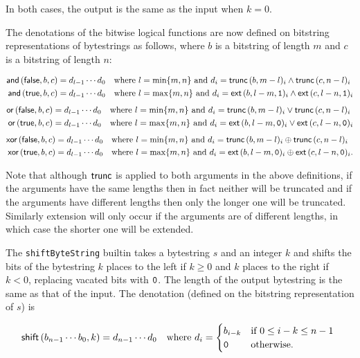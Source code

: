 \noindent In both cases, the output is the same as the input when $k=0$.
\smallskip

\noindent The denotations of the bitwise logical functions are now defined on bitstring
representations of bytestrings as follows, where $b$ is a bitstring of length $m$ and $c$
is a bitstring of length $n$:

\begin{align*}
\mathsf{and}\,(\mathsf{false}, b, c) &= d_{l-1} \cdots d_0
\quad \text{where $l=\min\{m,n\}$ and $d_i = \mathbf{\mathsf{trunc}}\,(b,m-l)_i \wedge \mathbf{\mathsf{trunc}}\,(c,n-l)_i$}\\
\mathsf{and}\,(\mathsf{true}, b, c) &= d_{l-1} \cdots d_0
\quad \text{where $l=\max\{m,n\}$ and $d_i = \mathbf{\textsf{ext}}\,(b,l-m,\mathtt{1})_i \wedge \mathbf{\textsf{ext}}\,(c,l-n,\mathtt{1})_i$}
\end{align*}
%
\begin{align*}
\mathsf{or}\,(\mathsf{false}, b, c) &= d_{l-1} \cdots d_0
  \quad \text{where $l=\min\{m,n\}$ and $d_i = \mathbf{\mathsf{trunc}}\,(b,m-l)_i \vee \mathbf{\mathsf{trunc}}\,(c,n-l)_i$}\\
\mathsf{or}\,(\mathsf{true}, b, c) &= d_{l-1} \cdots d_0
\quad \text{where $l=\max\{m,n\}$ and $d_i = \mathbf{\textsf{ext}}\,(b,l-m,\mathtt{0})_i \vee \mathbf{\textsf{ext}}\,(c,l-n,\mathtt{0})_i$}
\end{align*}
%
\begin{align*}
\mathsf{xor}\,(\mathsf{false}, b, c) &= d_{l-1} \cdots d_0
  \quad \text{where $l=\min\{m,n\}$ and $d_i = \mathbf{\mathsf{trunc}}\,(b,m-l)_i \oplus \mathbf{\mathsf{trunc}}\,(c,n-l)_i$}\\
\mathsf{xor}\,(\mathsf{true}, b, c) &= d_{l-1} \cdots d_0
\quad \text{where $l=\max\{m,n\}$ and $d_i = \mathbf{\textsf{ext}}\,(b,l-m,\mathtt{0})_i \oplus \mathbf{\textsf{ext}}\,(c,l-n,\mathtt{0})_i$}.
\end{align*}

\noindent
Note that although $\mathbf{\mathsf{trunc}}$ is applied to both arguments in the above
definitions, if the arguments have the same lengths then in fact neither will be
truncated and if the arguments have different lengths then only the longer one
will be truncated.  Similarly extension will only occur if the arguments are
of different lengths, in which case the shorter one will be extended.

\label{note:shift}
The \texttt{shiftByteString} builtin takes a bytestring $s$ and an integer $k$ and
shifts the bits of the bytestring $k$ places to the left if $k \geq 0$ and $k$
places to the right if $k < 0$, replacing vacated bits with $\mathtt{0}$.  The
length of the output bytestring is the same as that of the input.  The
denotation (defined on the bitstring representation of $s$) is

$$
\mathsf{shift}\,(b_{n-1} \cdots b_0, k) =
  d_{n-1} \cdots d_0 \quad \text{where }
  d_i = \begin{cases}
     b_{i-k} & \text{if $0 \leq i-k \leq n-1$ }\\
     \mathtt{0} & \text{otherwise.}\\
\end{cases}
$$

